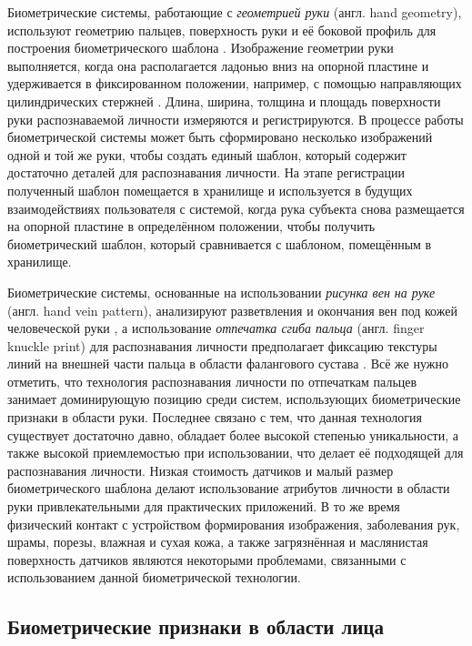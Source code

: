 \documentclass[12pt]{book}
\begin{document}
\large{Биометрические системы, работающие с \textit{геометрией руки} (англ. hand geometry), используют геометрию пальцев, поверхность руки и её боковой профиль для построения биометрического шаблона \cite{unar_2014, taher_2022}. Изображение геометрии руки выполняется, когда она располагается ладонью вниз на опорной пластине и удерживается в фиксированном положении, например, с помощью направляющих цилиндрических стержней \cite{taher_2022}. Длина, ширина, толщина и площадь поверхности руки распознаваемой личности измеряются и регистрируются. В процессе работы биометрической системы может быть сформировано несколько изображений одной и той же руки, чтобы создать единый шаблон, который содержит достаточно деталей для распознавания личности. На этапе регистрации полученный шаблон помещается в хранилище и используется в будущих взаимодействиях пользователя с системой, когда рука субъекта снова размещается на опорной пластине в определённом положении, чтобы получить биометрический шаблон, который сравнивается с шаблоном, помещённым в хранилище.}

\large{Биометрические системы, основанные на использовании \textit{рисунка вен на руке} (англ. hand vein pattern), анализируют разветвления и окончания вен под кожей человеческой руки \cite{unar_2014, tamimi_2019, hemis_2024}, а использование \textit{отпечатка сгиба пальца} (англ. finger knuckle print) для распознавания личности предполагает фиксацию текстуры линий на внешней части пальца в области фалангового сустава \cite{unar_2014, tarawneh_2022}. Всё же нужно отметить, что технология распознавания личности по отпечаткам пальцев занимает доминирующую позицию среди систем, использующих биометрические признаки в области руки. Последнее связано с тем, что данная технология существует достаточно давно, обладает более высокой степенью уникальности, а также высокой приемлемостью при использовании, что делает её подходящей для распознавания личности. Низкая стоимость датчиков и малый размер биометрического шаблона делают использование атрибутов личности в области руки привлекательными для практических приложений. В то же время физический контакт с устройством формирования изображения, заболевания рук, шрамы, порезы, влажная и сухая кожа, а также загрязнённая и маслянистая поверхность датчиков являются некоторыми проблемами, связанными с использованием данной биометрической технологии.}

\subsection{Биометрические признаки в области лица}
\end{document}
